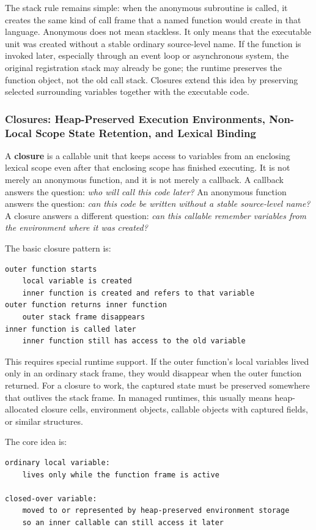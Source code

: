 \documentclass[a4paper,twoside]{report}
\begin{document}
The stack rule remains simple: when the anonymous subroutine is called, it creates the same kind of call frame that a named function would create in that language. Anonymous does not mean stackless. It only means that the executable unit was created without a stable ordinary source-level name. If the function is invoked later, especially through an event loop or asynchronous system, the original registration stack may already be gone; the runtime preserves the function object, not the old call stack. Closures extend this idea by preserving selected surrounding variables together with the executable code.


\subsubsection{Closures: Heap-Preserved Execution Environments, Non-Local Scope State Retention, and Lexical Binding}

A \textbf{closure} is a callable unit that keeps access to variables from an enclosing lexical scope even after that enclosing scope has finished executing. It is not merely an anonymous function, and it is not merely a callback. A callback answers the question: \emph{who will call this code later?} An anonymous function answers the question: \emph{can this code be written without a stable source-level name?} A closure answers a different question: \emph{can this callable remember variables from the environment where it was created?}

The basic closure pattern is:

\begin{verbatim}
outer function starts
    local variable is created
    inner function is created and refers to that variable
outer function returns inner function
    outer stack frame disappears
inner function is called later
    inner function still has access to the old variable
\end{verbatim}

This requires special runtime support. If the outer function's local variables lived only in an ordinary stack frame, they would disappear when the outer function returned. For a closure to work, the captured state must be preserved somewhere that outlives the stack frame. In managed runtimes, this usually means heap-allocated closure cells, environment objects, callable objects with captured fields, or similar structures.

The core idea is:

\begin{verbatim}
ordinary local variable:
    lives only while the function frame is active

closed-over variable:
    moved to or represented by heap-preserved environment storage
    so an inner callable can still access it later
\end{verbatim}
\end{document}
